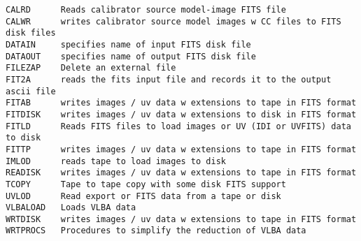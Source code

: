 \vskip 0.5pt
\bbve\begin{verbatim}
CALRD      Reads calibrator source model-image FITS file
CALWR      writes calibrator source model images w CC files to FITS disk files
DATAIN     specifies name of input FITS disk file
DATAOUT    specifies name of output FITS disk file
FILEZAP    Delete an external file
FIT2A      reads the fits input file and records it to the output ascii file
FITAB      writes images / uv data w extensions to tape in FITS format
FITDISK    writes images / uv data w extensions to disk in FITS format
FITLD      Reads FITS files to load images or UV (IDI or UVFITS) data to disk
FITTP      writes images / uv data w extensions to tape in FITS format
IMLOD      reads tape to load images to disk
READISK    writes images / uv data w extensions to tape in FITS format
TCOPY      Tape to tape copy with some disk FITS support
UVLOD      Read export or FITS data from a tape or disk
VLBALOAD   Loads VLBA data
WRTDISK    writes images / uv data w extensions to tape in FITS format
WRTPROCS   Procedures to simplify the reduction of VLBA data
\end{verbatim}\eve


